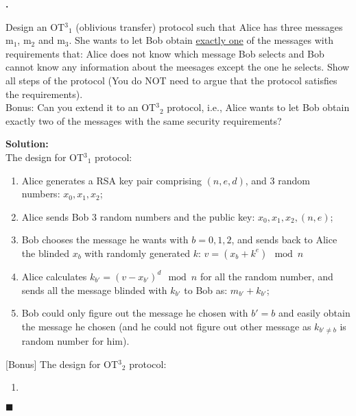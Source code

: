 \documentclass{article}
\newcounter{pcounter}                                   %
\newenvironment{problem}                                %
{                                                       %
    \color{gray}                                        %
    \stepcounter{pcounter}                              %
    \textbf{\arabic{pcounter}.}                         %
}{}                                                     %
\newenvironment{solution}                               %
{\textbf{Solution:} \\}{$\blacksquare$\newline}         %
\begin{document}
    \begin{problem}
        Design an OT${^3}_1$ (oblivious transfer) protocol such that Alice has three messages m$_1$, m$_2$ and m$_3$.
        She wants to let Bob obtain \underline{exactly one} of the messages with requirements that: Alice does not know which message Bob selects and Bob cannot know any information about the meesages except the one he selects.
        Show all steps of the protocol (You do NOT need to argue that the protocol satisfies the requirements).
        \\
        Bonus: Can you extend it to an OT${^3}_2$ protocol, i.e., Alice wants to let Bob obtain exactly two of the messages with the same security requirements?
    \end{problem}

    \begin{solution}
        The design for OT${^3}_1$ protocol:
        \begin{enumerate}
            \item Alice generates a RSA key pair comprising $(n, e, d)$, and 3 random numbers: $x_0, x_1, x_2$;
            \item Alice sends Bob 3 random numbers and the public key: $x_0, x_1, x_2, (n, e)$;
            \item Bob chooses the message he wants with $b=0,1,2$, and sends back to Alice the blinded $x_b$ with randomly generated $k$: $v = (x_b + k^e) \mod{n}$
            \item Alice calculates $k_{b'} = (v - x_{b'})^d \mod{n}$ for all the random number, and sends all the message blinded with $k_{b'}$ to Bob as: $m_{b'} + k_{b'}$;
            \item Bob could only figure out the message he chosen with $b' = b$ and easily obtain the message he chosen (and he could not figure out other message as $k_{b' \neq b}$ is random number for him).
        \end{enumerate}

        {[Bonus]} The design for OT${^3}_2$ protocol:
        \begin{enumerate}
            \item 
        \end{enumerate}
    \end{solution}
\end{document}
